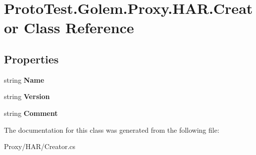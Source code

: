 \hypertarget{class_proto_test_1_1_golem_1_1_proxy_1_1_h_a_r_1_1_creator}{\section{Proto\-Test.\-Golem.\-Proxy.\-H\-A\-R.\-Creator Class Reference}
\label{class_proto_test_1_1_golem_1_1_proxy_1_1_h_a_r_1_1_creator}
}
\subsection*{Properties}
\begin{DoxyCompactItemize}
\item 
\hypertarget{class_proto_test_1_1_golem_1_1_proxy_1_1_h_a_r_1_1_creator_a8b23e757519f86ee12f360e4aa5a3e46}{string {\bfseries Name}}\label{class_proto_test_1_1_golem_1_1_proxy_1_1_h_a_r_1_1_creator_a8b23e757519f86ee12f360e4aa5a3e46}

\item 
\hypertarget{class_proto_test_1_1_golem_1_1_proxy_1_1_h_a_r_1_1_creator_a5149764c9e410185301203a17f3444b6}{string {\bfseries Version}}\label{class_proto_test_1_1_golem_1_1_proxy_1_1_h_a_r_1_1_creator_a5149764c9e410185301203a17f3444b6}

\item 
\hypertarget{class_proto_test_1_1_golem_1_1_proxy_1_1_h_a_r_1_1_creator_a354f605c38e11a31454fc0e7884099f1}{string {\bfseries Comment}}\label{class_proto_test_1_1_golem_1_1_proxy_1_1_h_a_r_1_1_creator_a354f605c38e11a31454fc0e7884099f1}

\end{DoxyCompactItemize}


The documentation for this class was generated from the following file\-:\begin{DoxyCompactItemize}
\item 
Proxy/\-H\-A\-R/Creator.\-cs\end{DoxyCompactItemize}
